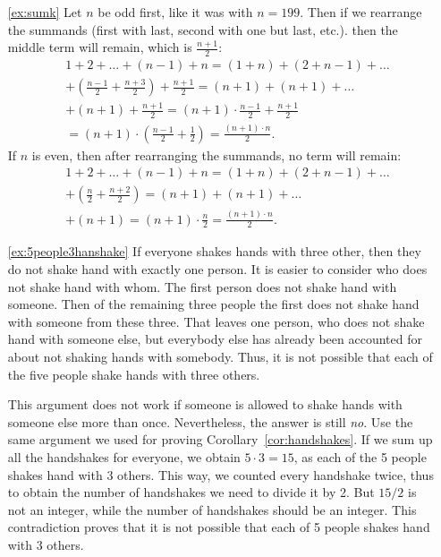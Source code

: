 \begin{enumerate}

\item[\ref{ex:sumk}]
Let $n$ be odd first, 
like it was with $n=199$. 
Then if we rearrange the summands (first with last, second with one but last, etc.). 
then the middle term will remain, 
which is $\frac{n+1}{2}$: 
\begin{align*}
& 1 + 2 + \dots + \left(n-1\right) + n = \left(1 + n\right) + \left(2 + n-1\right) + \dots \\
&+ \left(\frac{n-1}{2} + \frac{n+3}{2} \right) + \frac{n+1}{2} = (n+1) + (n+1) + \dots \\
&+ (n+1) +  \frac{n+1}{2} = \left( n+1 \right) \cdot \frac{n-1}{2} + \frac{n+1}{2} \\
&= \left( n+1 \right) \cdot \left( \frac{n-1}{2} + \frac{1}{2} \right) = \frac{(n+1) \cdot n}{2}. 
\end{align*}
If $n$ is even, 
then after rearranging the summands, no term will remain: 
\begin{align*}
& 1 + 2 + \dots + \left(n-1\right) + n = \left(1 + n\right) + \left(2 + n-1\right) + \dots \\
&+ \left(\frac{n}{2} + \frac{n+2}{2} \right) = (n+1) + (n+1) + \dots \\
&+ (n+1) = \left( n+1 \right) \cdot \frac{n}{2} = \frac{(n+1) \cdot n}{2}. 
\end{align*}

\item[\ref{ex:5people3hanshake}]
If everyone shakes hands with three other, 
then they do not shake hand with exactly one person. 
It is easier to consider who does not shake hand with whom. 
The first person does not shake hand with someone. 
Then of the remaining three people the first does not shake hand with someone from these three. 
That leaves one person, who does not shake hand with someone else, 
but everybody else has already been accounted for about not shaking hands with somebody. 
Thus, it is not possible that each of the five people shake hands with three others. 

This argument does not work if someone is allowed to shake hands with someone else more than once. 
Nevertheless, the answer is still \emph{no}. 
Use the same argument we used for proving Corollary~\ref{cor:handshakes}. 
If we sum up all the handshakes for everyone, we obtain $5 \cdot 3 = 15$, 
as each of the 5 people shakes hand with 3 others. 
This way, we counted every handshake twice, 
thus to obtain the number of handshakes we need to divide it by 2. 
But $15/2$ is not an integer, 
while the number of handshakes should be an integer. 
This contradiction proves that it is not possible that each of 5 people shakes hand with 3 others. 


\end{enumerate}
